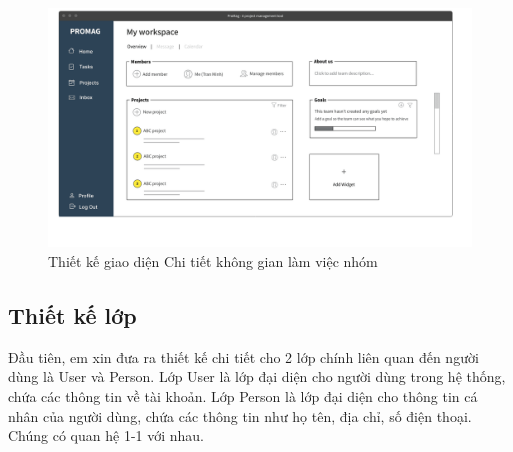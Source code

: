 \documentclass[../DoAn.tex]{subfiles}
\begin{document}
\begin{figure}[H]
    \centering
    \includegraphics[width=1.0\linewidth]{Hinhve/Mockup_MyWorkspace.png}
    \caption{Thiết kế giao diện Chi tiết không gian làm việc nhóm}
    \label{fig:Mockup_MyWorkspace}
\end{figure}

\newpage

\subsection{Thiết kế lớp}
\label{subsection:4.2.2}

Đầu tiên, em xin đưa ra thiết kế chi tiết cho 2 lớp chính liên quan đến người dùng là User và Person.
Lớp User là lớp đại diện cho người dùng trong hệ thống, chứa các thông tin về tài khoản. Lớp Person là lớp đại diện cho thông tin
cá nhân của người dùng, chứa các thông tin như họ tên, địa chỉ, số điện thoại. Chúng có quan hệ 1-1 với nhau.
\end{document}
